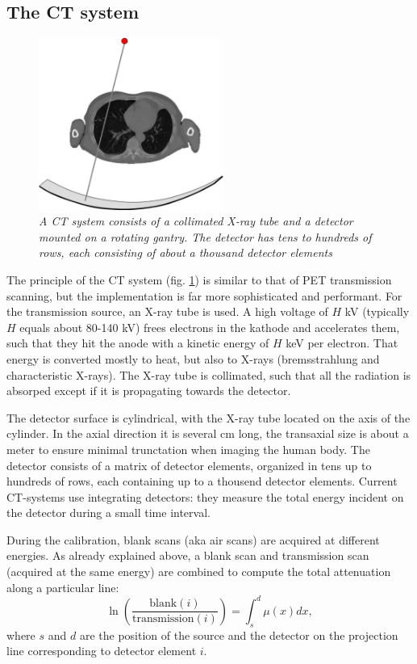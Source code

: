 \subsection{The CT system}
\begin{figure}[tbp]
\centering \includegraphics[width=0.54\textwidth]{figs/fig_ct.pdf} 
\caption{\label{fig:ct} \emph{A CT system consists of a collimated
    X-ray tube and a detector mounted on a rotating gantry. The
    detector has tens to hundreds of rows, each consisting of about a
    thousand detector elements}}
\end{figure}
%
The principle of the CT system (fig. \ref{fig:ct}) is similar to that
of PET transmission scanning, but the implementation is far more
sophisticated and performant. For the transmission source, an X-ray
tube is used. A high voltage of $H$ kV (typically $H$ equals about
80-140 kV) frees electrons in the kathode and accelerates them, such
that they hit the anode with a kinetic energy of $H$ keV per electron.
That energy is converted mostly to heat, but also to X-rays
(bremsstrahlung and characteristic X-rays). The X-ray tube is
collimated, such that all the radiation is absorped except if it is
propagating towards the detector.

The detector surface is cylindrical, with the X-ray tube located on
the axis of the cylinder. In the axial direction it is several cm
long, the transaxial size is about a meter to ensure minimal
trunctation when imaging the human body. The detector consists of a
matrix of detector elements, organized in tens up to hundreds of rows,
each containing up to a thousend detector elements. Current CT-systems
use integrating detectors: they measure the total energy incident on
the detector during a small time interval.

During the calibration, blank scans (aka air scans) are acquired at
different energies. As already explained above, a blank scan and
transmission scan (acquired at the same energy) are combined to
compute the total attenuation along a particular line:
\begin{equation}
  \ln\left(\frac{\mbox{blank}(i)}{\mbox{transmission}(i)}\right) 
     = \int_s^d \mu(x) dx, \label{eq:totatten}
\end{equation}
where $s$ and $d$ are the position of the source and the detector on
the projection line corresponding to detector element $i$.

